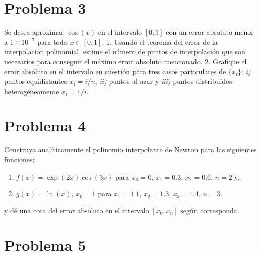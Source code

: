 \documentclass[11pt]{article}
\providecommand{\tightlist}{%
      \setlength{\itemsep}{0pt}\setlength{\parskip}{0pt}}
\begin{document}
    \hypertarget{problema-3}{%
\section*{Problema 3}\label{problema-3}}

Se desea aproximar \(\cos(x)\) en el intervalo \([0,1]\) con un error
absoluto menor a \(1\times 10^{-7}\) para todo \(x \in [0,1]\). 1.
Usando el teorema del error de la interpolación polinomial, estime el
número de puntos de interpolación que son necesarios para conseguir el
máximo error absoluto mencionado. 2. Grafique el error absoluto en el
intervalo en cuestión para tres casos particulares de \(\{x_i\}\):
\emph{i)} puntos equidistantes \(x_i=i/n\), \emph{ii)} puntos al azar y
\emph{iii)} puntos distribuidos heterogéneamente \(x_i=1/i\).

    \hypertarget{problema-4}{%
\section*{Problema 4}\label{problema-4}}

Construya analíticamente el polinomio interpolante de Newton para las
siguientes funciones:

\begin{enumerate}
\def\labelenumi{\arabic{enumi}.}
\tightlist
\item
  \(f(x) = \exp (2x) \cos(3x)\) para \(x_0=0\), \(x_1=0.3\),
  \(x_2=0.6\), \(n=2\) y,
\item
  \(g(x) = \ln(x)\), \(x_0=1\) para \(x_1=1.1\), \(x_2=1.3\),
  \(x_3=1.4\), \(n=3\).
\end{enumerate}

y dé una cota del error absoluto en el intervalo \([x_0,x_n]\) según
corresponda.

    \hypertarget{problema-5}{%
\section*{Problema 5}\label{problema-5}}
\end{document}

